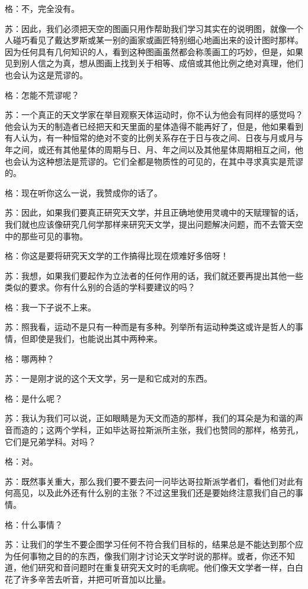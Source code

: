 \documentclass[12pt,oneside]{book}
\begin{document}
格：不，完全没有。

苏：因此，我们必须把天空的图画只用作帮助我们学习其实在的说明图，就像一个人碰巧看见了戴达罗斯或某一别的画家或画匠特别细心地画出来的设计图时那样。因为任何具有几何知识的人，看到这种图画虽然都会称羡画工的巧妙，但是，如果见到别人信之为真，想从图画上找到关于相等、成倍或其他比例之绝对真理，他们也会认为这是荒谬的。

格：怎能不荒谬呢？

苏：一个真正的天文学家在举目观察天体运动时，你不认为他会有同样的感觉吗？他会认为天的制造者已经把天和天里面的星体造得不能再好了，但是，他如果看到有人认为，有一种恒常的绝对不变的比例关系存在于日与夜之间、日夜与月或月与年之间，或还有其他星体的周期与日、月、年之间以及其他星体周期相互之间，他也会认为这种想法是荒谬的。它们全都是物质性的可见的，在其中寻求真实是荒谬的。

格：现在听你这么一说，我赞成你的话了。

苏：因此，如果我们要真正研究天文学，并且正确地使用灵魂中的天赋理智的话，我们就也应该像研究几何学那样来研究天文学，提出问题解决问题，而不去管天空中的那些可见的事物。

格：你这是要将研究天文学的工作搞得比现在烦难好多倍呀！

苏：我想，如果我们要起作为立法者的任何作用的话，我们就还要再提出其他一些类似的要求。你有什么别的合适的学科要建议的吗？

格：我一下子说不上来。

苏：照我看，运动不是只有一种而是有多种。列举所有运动种类这或许是哲人的事情，但即使是我们，也能说出其中两种来。

格：哪两种？

苏：一是刚才说的这个天文学，另一是和它成对的东西。

格：是什么呢？

苏：我认为我们可以说，正如眼睛是为天文而造的那样，我们的耳朵是为和谐的声音而造的；这两个学科，正如毕达哥拉斯派所主张，我们也赞同的那样，格劳孔，它们是兄弟学科。对吗？

格：对。

苏：既然事关重大，那么我们要不要去问一问毕达哥拉斯派学者们，看他们对此有何高见，以及此外还有什么别的主张？不过这里我们还是要始终注意我们自己的事情。

格：什么事情？

苏：让我们的学生不要企图学习任何不符合我们目标的，结果总是不能达到那个应为任何事物之目的的东西，像我们刚才讨论天文学时说的那样。或者，你还不知道，他们研究和音问题时在重复研究天文时的毛病呢。他们像天文学者一样，白白花了许多辛苦去听音，并把可听音加以比量。
\end{document}
